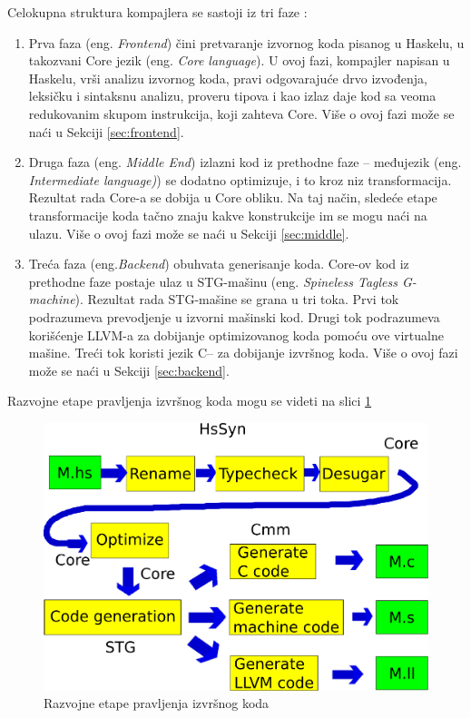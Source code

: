 Celokupna struktura kompajlera se sastoji iz tri faze :
\begin{enumerate}
	\item Prva faza (eng. \emph{Frontend}) čini pretvaranje izvornog koda pisanog u Haskelu, u takozvani Core jezik (eng. \emph {Core language}). U ovoj fazi, kompajler napisan u Haskelu, vrši analizu izvornog koda, pravi odgovarajuće drvo izvođenja, leksičku i sintaksnu analizu, proveru tipova i kao izlaz daje kod sa veoma redukovanim skupom instrukcija, koji zahteva Core. Više o ovoj fazi može se naći u Sekciji \ref{sec:frontend}.
	\item Druga faza (eng. \emph {Middle End}) izlazni kod iz prethodne faze – međujezik (eng. \emph {Intermediate language)}) se dodatno optimizuje, i to kroz niz transformacija. Rezultat rada Core-a se dobija u Core obliku. Na taj način, sledeće etape transformacije koda tačno znaju kakve konstrukcije im se mogu naći na ulazu.  Više o ovoj fazi može se naći u Sekciji \ref{sec:middle}.
	\item Treća faza (eng.\emph {Backend}) obuhvata generisanje koda. Core-ov kod iz prethodne faze postaje ulaz u STG-mašinu (eng. \emph {Spineless Tagless G-machine}). Rezultat rada STG-mašine se grana u tri toka. Prvi tok podrazumeva prevodjenje u izvorni mašinski kod. Drugi tok podrazumeva korišćenje LLVM-a za dobijanje optimizovanog koda pomoću ove virtualne mašine. Treći tok koristi jezik C-- za dobijanje izvršnog koda. Više o ovoj fazi može se naći u Sekciji \ref{sec:backend}.
\end{enumerate}

Razvojne etape pravljenja izvršnog koda mogu se videti na slici \ref{fig:razvojneEtaple}

\begin{figure}[h!]
	\begin{center}
		\includegraphics[scale=0.30]{resources/razvojneEtape.png}
	\end{center}
	\caption{Razvojne etape pravljenja izvršnog koda}
	\label{fig:razvojneEtaple}
\end{figure}